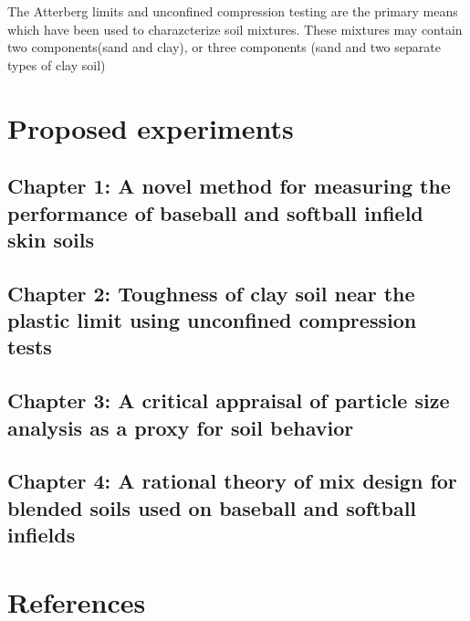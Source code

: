 \documentclass[
]{book}
\begin{document}
The Atterberg limits and unconfined compression testing are the primary means which have been used to charazcterize soil mixtures. These mixtures may contain two components(sand and clay), or three components (sand and two separate types of clay soil)

\hypertarget{proposed-experiments}{%
\chapter{Proposed experiments}\label{proposed-experiments}}

\hypertarget{chapter-1-a-novel-method-for-measuring-the-performance-of-baseball-and-softball-infield-skin-soils}{%
\section{Chapter 1: A novel method for measuring the performance of baseball and softball infield skin soils}\label{chapter-1-a-novel-method-for-measuring-the-performance-of-baseball-and-softball-infield-skin-soils}}

\hypertarget{chapter-2-toughness-of-clay-soil-near-the-plastic-limit-using-unconfined-compression-tests}{%
\section{Chapter 2: Toughness of clay soil near the plastic limit using unconfined compression tests}\label{chapter-2-toughness-of-clay-soil-near-the-plastic-limit-using-unconfined-compression-tests}}

\hypertarget{chapter-3-a-critical-appraisal-of-particle-size-analysis-as-a-proxy-for-soil-behavior}{%
\section{Chapter 3: A critical appraisal of particle size analysis as a proxy for soil behavior}\label{chapter-3-a-critical-appraisal-of-particle-size-analysis-as-a-proxy-for-soil-behavior}}

\hypertarget{chapter-4-a-rational-theory-of-mix-design-for-blended-soils-used-on-baseball-and-softball-infields}{%
\section{Chapter 4: A rational theory of mix design for blended soils used on baseball and softball infields}\label{chapter-4-a-rational-theory-of-mix-design-for-blended-soils-used-on-baseball-and-softball-infields}}

\hypertarget{references}{%
\chapter{References}\label{references}}

  
\end{document}

